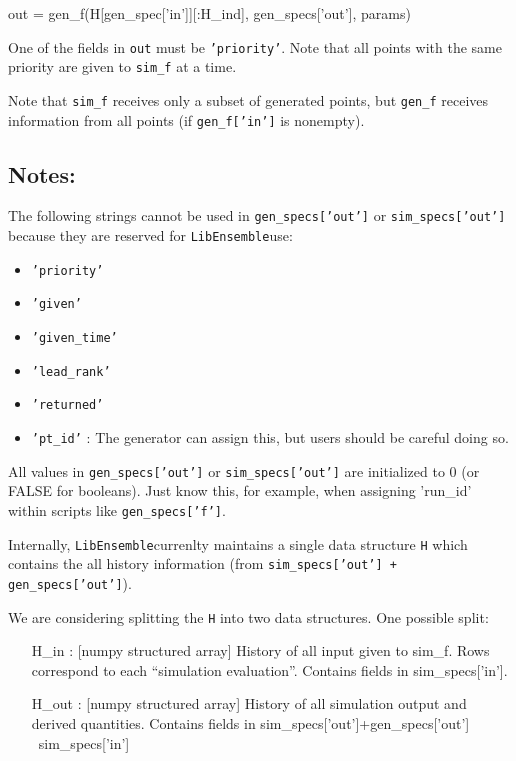 \documentclass{article}
\newenvironment{allintypewriter}{\ttfamily}{\par}
\newcommand{\libE}{\texttt{LibEnsemble}}
\begin{document}
\begin{allintypewriter}
  out = gen\_f(H[gen\_spec['in']][:H\_ind], gen\_specs['out'], params)\\
\end{allintypewriter}

One of the fields in \texttt{out} must be \texttt{'priority'}. Note that all
points with the same priority are given to \texttt{sim\_f} at a time.

Note that \texttt{sim\_f} receives only a subset of generated points, but
\texttt{gen\_f} receives information from all points (if \texttt{gen\_f['in']}
is nonempty).

\subsection{Notes:}
The following strings cannot be used in  \texttt{gen\_specs['out']} or
\texttt{sim\_specs['out']} because they are reserved for \libE use:
\begin{itemize}
  \item \texttt{'priority'}
  \item \texttt{'given'}
  \item \texttt{'given\_time'}
  \item \texttt{'lead\_rank'}
  \item \texttt{'returned'}
  \item \texttt{'pt\_id'} : The generator can assign this, but users should be
    careful doing so.
\end{itemize}

All values in \texttt{gen\_specs['out']} or \texttt{sim\_specs['out']} are
initialized to 0 (or FALSE for booleans). Just know this, for example, when
assigning 'run\_id' within scripts like \texttt{gen\_specs['f']}.

Internally, \libE currenlty maintains a single data structure \texttt{H} which
contains the all history information (from \texttt{sim\_specs['out'] +
gen\_specs['out']}). 

We are considering splitting the \texttt{H} into two data structures. One possible split:

\begin{allintypewriter}
  \begin{itemize}
    \item[H\_in]: [numpy structured array] History of all input given to
      sim\_f. Rows correspond to each ``simulation evaluation''. Contains fields
      in sim\_specs['in']. 
      
    \item[H\_out]: [numpy structured array] History of all simulation output
      and derived quantities. Contains fields in sim\_specs['out']+gen\_specs['out'] \ sim\_specs['in']
  \end{itemize}
\end{allintypewriter}
\end{document}
